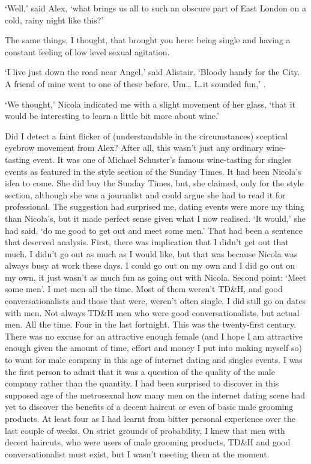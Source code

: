 `Well,' said Alex, `what brings us all to such an obscure part of
East London on a cold, rainy night like this?'

The same things, I thought, that brought you here: being single and
having a constant feeling of low level sexual agitation.

`I live just down the road near Angel,' said Alistair. `Bloody handy
for the City. A friend of mine went to one of these before. Um\dots
I\dots it sounded fun,' .

`We thought,' Nicola indicated me with a slight movement of her
glass, `that it would be interesting to learn a little bit more
about wine.'

Did I detect a faint flicker of (understandable in the
circumstances) sceptical eyebrow movement from Alex? After all, this
wasn't just any ordinary wine-tasting event. It was one of Michael
Schuster's famous wine-tasting for singles events as featured in the
style section of the {\twelvesl Sunday Times\/}. It had been
Nicola's idea to come. She did buy the {\twelvesl Sunday Times},
but, she claimed, only for the style section, although she was a journalist and could argue she had to read it for professional. The suggestion had surprised me, dating events were more my thing than Nicola's, but it made perfect sense given what I now realised. `It would,' she had
said, `do me good to get out and meet some men.' That had been a
sentence that deserved analysis. First, there was
implication that I didn't get out that much. I didn't go out as much
as I would like, but that was because Nicola was always busy at work
these days. I could go out on my own and I {\twelveit did\/} go out
on my own, it just wasn't as much fun as going out with Nicola.
Second point: `Meet some men'. I met men all the time. Most of them
weren't TD{\&}H, and good conversationalists and those that were,
weren't often single. I did still go on {\twelveit dates\/} with
men. Not always TD{\&H} men who were good conversationalists, but
actual men. All the time. Four in the last fortnight. This was the
twenty-first century. There was no excuse for an attractive enough female
(and I hope I am attractive enough given the amount of time,
effort and money I put into making myself so) to want for male
company in this age of internet dating and singles events. I was the
first person to admit that it was a question of the quality of the
male company rather than the quantity. I had been surprised to
discover in this supposed age of the metrosexual how many men on the
internet dating scene had yet to discover the benefits of a decent
haircut or even of basic male grooming products. At least four as I
had learnt from bitter personal experience over the last couple of
weeks. On strict grounds of probability, I knew that men with decent
haircuts, who were users of male grooming products, TD{\&}H and good
conversationalist must exist, but I wasn't meeting them at the moment.

